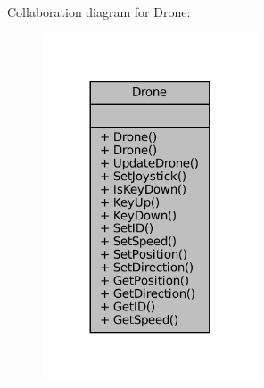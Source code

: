 Collaboration diagram for Drone\+:\nopagebreak
\begin{figure}[H]
\begin{center}
\leavevmode
\includegraphics[width=180pt]{classDrone__coll__graph}
\end{center}
\end{figure}
